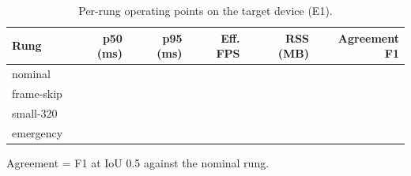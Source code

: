 \begin{table}[t]
\centering\small
\caption{Per-rung operating points on the target device (E1).}\label{tab:rungs}
\begin{tabular}{lrrrrr}
\toprule
Rung & p50 (ms) & p95 (ms) & Eff. FPS & RSS (MB) & Agreement F1 \\
\midrule
nominal & \TBD{} & \TBD{} & \TBD{} & \TBD{} & \TBD{} \\
frame-skip & \TBD{} & \TBD{} & \TBD{} & \TBD{} & \TBD{} \\
small-320 & \TBD{} & \TBD{} & \TBD{} & \TBD{} & \TBD{} \\
emergency & \TBD{} & \TBD{} & \TBD{} & \TBD{} & \TBD{} \\
\bottomrule
\end{tabular}
\par\smallskip\footnotesize Agreement = F1 at IoU 0.5 against the nominal rung.
\end{table}
